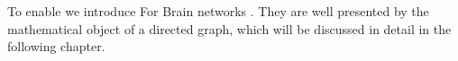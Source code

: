 To enable we introduce 
For Brain networks . They are well presented by the mathematical
object of a directed graph, which will be discussed in detail in the
following chapter.









